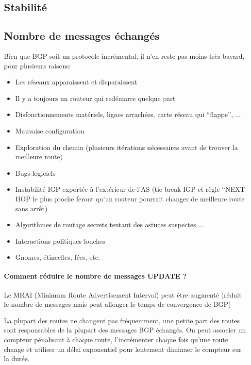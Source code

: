 \documentclass{article}
\begin{document}
\begin{sffamily}
\subsection{Stabilité}

\subsection{Nombre de messages échangés}

Bien que BGP soit un protocole incrémental, il n'en reste pas moins
très bavard, pour plusieurs raisons:

\begin{itemize}
\item Les réseaux apparaissent et disparaissent
\item Il y a toujours un routeur qui redémarre quelque part
\item Disfonctionnements matériels, lignes arrachées, carte réseau qui
  ``flappe'', ...
\item Mauvaise configuration
\item Exploration du chemin (plusieurs itérations nécessaires avant de
  trouver la meilleure route)
\item Bugs logiciels
\item Instabilité IGP exportée à l'extérieur de l'AS (tie-break IGP et
  règle ``NEXT-HOP le plus proche feront qu'un routeur pourrait
  changer de meilleure route sans arrêt)
\item Algorithmes de routage secrets tentant des astuces suspectes ...
\item Interactions politiques louches
\item Gnomes, étincelles, fées, etc.
\end{itemize}

\paragraph{Comment réduire le nombre de messages UPDATE ?}

Le MRAI (Minimum Route Advertisement Interval) peut être augmenté
(réduit le nombre de messages mais peut allonger le temps de
convergence de BGP)

La plupart des routes ne changent pas fréquemment, une petite part des
routes sont responsables de la plupart des messages BGP échangés. On
peut associer un compteur pénalisant à chaque route, l'incrémenter
chaque fois qu'une route change et utiliser un délai exponentiel pour
lentement diminuer le compteur sur la durée.


\end{sffamily}
\end{document}

